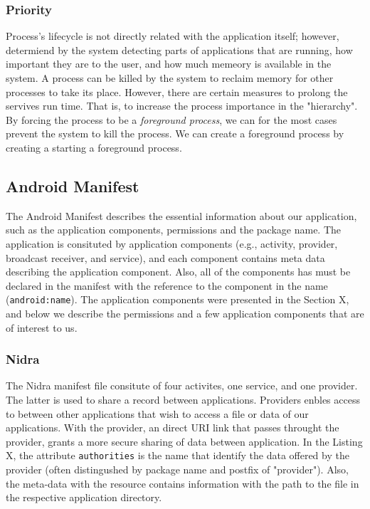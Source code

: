 \subsubsection{Priority}
Process's lifecycle is not directly related with the application itself; however, determiend by the system detecting parts of applications that are running, how important they are to the user, and how much memeory is available in the system. A process can be killed by the system to reclaim memory for other processes to take its place. However, there are certain measures to prolong the servives run time. That is, to increase the process importance in the "hierarchy". By forcing the process to be a \textit{foreground process}, we can for the most cases prevent the system to kill the process. We can create a foreground process by creating a starting a foreground process. 

\subsection{Android Manifest}
The Android Manifest describes the essential information about our application, such as the application components, permissions and the package name. The application is consituted by application components (e.g., activity, provider, broadcast receiver, and service), and each component contains meta data describing the application component. Also, all of the components has must be declared in the manifest with the reference to the component in the name  (\verb|android:name|). The application components were presented in the Section X, and below we describe the permissions and a few application components that are of interest to us.  

\subsubsection{Nidra}

The Nidra manifest file consitute of four activites, one service, and one provider. The latter is used to share a record between applications. Providers enbles access to between other applications that wish to access a file or data of our applications. With the provider, an direct URI link that passes throught the provider, grants a more secure sharing of data between application. In the Listing X, the attribute \verb|authorities| is the name that identify the data offered by the provider (often distingushed by package name and postfix of "provider"). Also, the meta-data with the resource contains information with the path to the file in the respective application directory. 

